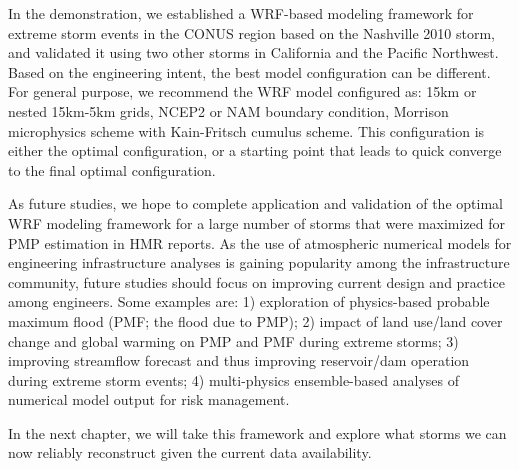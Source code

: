 In the demonstration, we established a WRF-based modeling framework for extreme storm events in the CONUS region based on the Nashville 2010 storm, and validated it using two other storms in California and the Pacific Northwest. Based on the engineering intent, the best model configuration can be different. For general purpose, we recommend the WRF model configured as: 15km or nested 15km-5km grids, NCEP2 or NAM boundary condition, Morrison microphysics scheme with Kain-Fritsch cumulus scheme. This configuration is either the optimal configuration, or a starting point that leads to quick converge to the final optimal configuration.

As future studies, we hope to complete application and validation of the optimal WRF modeling framework for a large number of storms that were maximized for PMP estimation in HMR reports. As the use of atmospheric numerical models for engineering infrastructure analyses is gaining popularity among the infrastructure community, future studies should focus on improving current design and practice among engineers. Some examples are: 1) exploration of physics-based probable maximum flood (PMF; the flood due to PMP); 2) impact of land use/land cover change and global warming on PMP and PMF during extreme storms; 3) improving streamflow forecast and thus improving reservoir/dam operation during extreme storm events; 4) multi-physics ensemble-based analyses of numerical model output for risk management.

In the next chapter, we will take this framework and explore what storms we can now reliably reconstruct given the current data availability.


